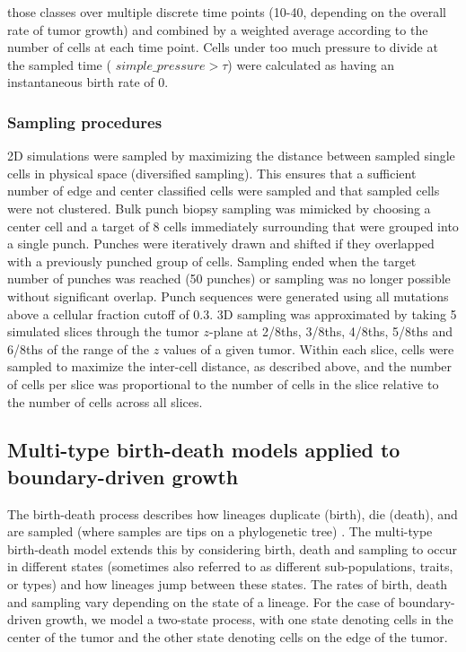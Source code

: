 \documentclass[12pt]{elife_based}
\begin{document}
those classes over multiple discrete time points (10-40, depending on the overall rate of tumor growth) and combined by a weighted average according to the number of cells at each time point. Cells under too much pressure to divide at the sampled time ( $\textit{simple\_pressure} > \tau$) were calculated as having an instantaneous birth rate of 0. 

\subsubsection*{Sampling procedures}
2D simulations were sampled by maximizing the distance between sampled single cells in physical space (diversified sampling). This ensures that a sufficient number of edge and center classified cells were sampled and that sampled cells were not clustered. Bulk punch biopsy sampling was mimicked by choosing a center cell and a target of 8 cells immediately surrounding that were grouped into a single punch. Punches were iteratively drawn and shifted if they overlapped with a previously punched group of cells. Sampling ended when the target number of punches was reached (50 punches) or sampling was no longer possible without significant overlap. Punch sequences were generated using all mutations above a cellular fraction cutoff of 0.3. 3D sampling was approximated by taking 5 simulated slices through the tumor $z$-plane at 2/8ths, 3/8ths, 4/8ths, 5/8ths and 6/8ths of the range of the $z$ values of a given tumor. Within each slice, cells were sampled to maximize the inter-cell distance, as described above, and the number of cells per slice was proportional to the number of cells in the slice relative to the number of cells across all slices.

\subsection*{Multi-type birth-death models applied to boundary-driven growth}
The birth-death process describes how lineages duplicate (birth), die (death), and are sampled (where samples are tips on a phylogenetic tree) \citep{gernhard2008conditioned}.
The multi-type birth-death model extends this by considering birth, death and sampling to occur in different states (sometimes also referred to as different sub-populations, traits, or types) and how lineages jump between these states. The rates of birth, death and sampling vary depending on the state of a lineage. For the case of boundary-driven growth, we model a two-state process, with one state denoting cells in the center of the tumor and the other state denoting cells on the edge of the tumor. 
\end{document}

